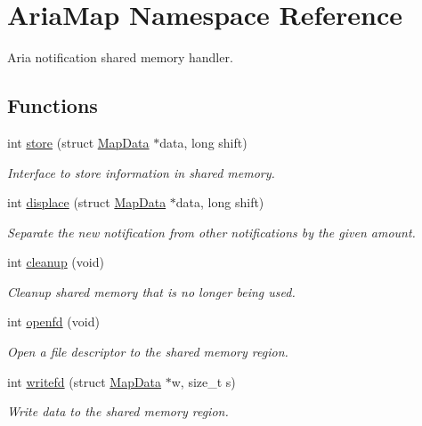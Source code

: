\hypertarget{namespaceAriaMap}{}\section{Aria\+Map Namespace Reference}
\label{namespaceAriaMap}


Aria notification shared memory handler.  


\subsection*{Functions}
\begin{DoxyCompactItemize}
\item 
int \hyperlink{namespaceAriaMap_ab476269022f8048bbb7618a4830eeabd}{store} (struct \hyperlink{structMapData}{Map\+Data} $\ast$data, long shift)
\begin{DoxyCompactList}\small\item\em Interface to store information in shared memory. \end{DoxyCompactList}\item 
int \hyperlink{namespaceAriaMap_aad25e1bc6cbd702fd569df804d90e464}{displace} (struct \hyperlink{structMapData}{Map\+Data} $\ast$data, long shift)
\begin{DoxyCompactList}\small\item\em Separate the new notification from other notifications by the given amount. \end{DoxyCompactList}\item 
int \hyperlink{namespaceAriaMap_a0820778a918ad835c8b7b9dbd2b0ae9e}{cleanup} (void)
\begin{DoxyCompactList}\small\item\em Cleanup shared memory that is no longer being used. \end{DoxyCompactList}\item 
int \hyperlink{namespaceAriaMap_a7775ad4992d7a25a554896bc3ed5e4ce}{openfd} (void)
\begin{DoxyCompactList}\small\item\em Open a file descriptor to the shared memory region. \end{DoxyCompactList}\item 
int \hyperlink{namespaceAriaMap_ae9ed69be092b57caff848ae611339adf}{writefd} (struct \hyperlink{structMapData}{Map\+Data} $\ast$w, size\+\_\+t s)
\begin{DoxyCompactList}\small\item\em Write data to the shared memory region. \end{DoxyCompactList}\item 

\end{DoxyCompactItemize}

